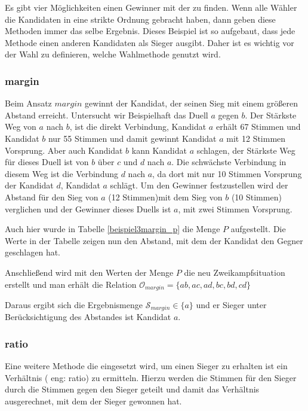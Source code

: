 Es gibt vier Möglichkeiten einen Gewinner mit der \schulze zu finden. Wenn alle Wähler die Kandidaten in eine strikte Ordnung gebracht haben, dann geben diese Methoden immer das selbe Ergebnis. Dieses Beispiel ist so aufgebaut, dass jede Methode einen anderen Kandidaten als Sieger ausgibt. Daher ist es wichtig vor der Wahl zu definieren, welche Wahlmethode genutzt wird.

\subsubsection[a]{margin}
\label{sec:margin}
Beim Ansatz $margin$ gewinnt der Kandidat, der seinen Sieg mit einem größeren Abstand erreicht. 
Untersucht wir Beispielhaft das Duell $a$ gegen $b$. Der Stärkste Weg von $a$ nach $b$, ist die direkt Verbindung, Kandidat $a$ erhält 67 Stimmen und Kandidat $b$ nur 55 Stimmen und damit gewinnt Kandidat $a$ mit 12 Stimmen Vorsprung. 
Aber auch Kandidat $b$ kann Kandidat $a$ schlagen, der Stärkste Weg für dieses Duell ist von $b$ über $c$ und $d$ nach $a$. Die schwächste Verbindung in diesem Weg ist die Verbindung $d$ nach $a$, da dort mit nur 10 Stimmen Vorsprung der Kandidat $d$, Kandidat $a$ schlägt.
Um den Gewinner festzustellen wird der Abstand für den Sieg von $a$ (12 Stimmen)mit dem Sieg von $b$ (10 Stimmen) verglichen und der Gewinner dieses Duells ist $a$, mit zwei Stimmen Vorsprung.

Auch hier wurde in Tabelle \ref{beispiel3margin_p} die Menge $P$ aufgestellt. Die Werte in der Tabelle zeigen nun den Abstand, mit dem der Kandidat den Gegner geschlagen hat.



\newpage
Anschließend wird mit den Werten der Menge $P$ die neu Zweikampfsituation erstellt und man erhält die Relation $\mathcal{O}_{margin} = \{ ab, ac,ad,bc,bd,cd \}$

Daraus ergibt sich die Ergebnismenge $\mathcal{S}_{margin} \in \{ a\}$ und er Sieger unter Berücksichtigung des Abstandes ist Kandidat $a$.

\subsubsection[a]{ratio}
\label{sec:ratio}
Eine weitere Methode die eingesetzt wird, um einen Sieger zu erhalten ist ein Verhältnis ( eng: ratio) zu ermitteln. Hierzu werden die Stimmen für den Sieger durch die Stimmen gegen den Sieger geteilt und damit das Verhältnis ausgerechnet, mit dem der Sieger gewonnen hat.

